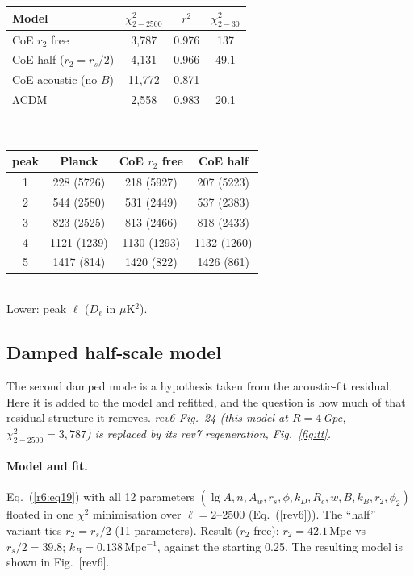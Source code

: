 \documentclass[11pt]{article}
\begin{document}
\par\medskip\noindent\begin{minipage}{\columnwidth}\centering\footnotesize\setlength{\tabcolsep}{4pt}
\label{r6:tab:fit}
\begin{tabular}{lccc}\toprule
Model & $\chi^2_{2-2500}$ & $r^2$ & $\chi^2_{2-30}$\\\midrule
CoE $r_2$ free & 3{,}787 & 0.976 & 137\\
CoE half ($r_2=r_s/2$) & 4{,}131 & 0.966 & 49.1\\
CoE acoustic (no $B$) & 11{,}772 & 0.871 & --\\
ΛCDM & 2{,}558 & 0.983 & 20.1\\\bottomrule
\end{tabular}\\[6pt]
\begin{tabular}{cccc}\toprule
peak & Planck & CoE $r_2$ free & CoE half\\\midrule
1&228 (5726)&218 (5927)&207 (5223)\\
2&544 (2580)&531 (2449)&537 (2383)\\
3&823 (2525)&813 (2466)&818 (2433)\\
4&1121 (1239)&1130 (1293)&1132 (1260)\\
5&1417 (814)&1420 (822)&1426 (861)\\\bottomrule
\end{tabular}\\[2pt]
Lower: peak $\ell$ ($D_\ell$ in $\mu$K$^2$).
\end{minipage}\par\medskip
\subsection{Damped half-scale model}
The second damped mode is a hypothesis taken from the acoustic-fit residual. Here it is added to the model and refitted, and the question is how much of that residual structure it removes.
\noindent\textit{rev6 Fig.~24 (this model at $R=4$\,Gpc, $\chi^2_{2-2500}=3{,}787$) is replaced by its rev7 regeneration, Fig.~\ref{fig:tt}.}

\paragraph{Model and fit.} Eq.~(\ref{r6:eq19}) with all 12 parameters $(\lg A,n,A_w,r_s,\phi,k_D,R_c,w,B,k_B,r_2,\phi_2)$ floated in one $\chi^2$ minimisation over $\ell=2$--2500 (Eq.~([rev6])). The ``half'' variant ties $r_2=r_s/2$ (11 parameters). Result ($r_2$ free): $r_2=42.1$\,Mpc vs $r_s/2=39.8$; $k_B=0.138$\,Mpc$^{-1}$, against the starting 0.25. The resulting model is shown in Fig.~[rev6].
\end{document}
